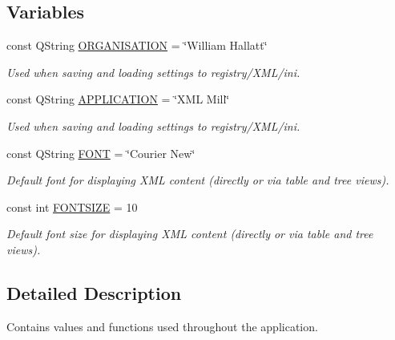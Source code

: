 \subsection*{\-Variables}
\begin{DoxyCompactItemize}
\item 
const \-Q\-String \hyperlink{namespace_g_c_global_space_a97583835f9987b1c94ff05802ccfe42f}{\-O\-R\-G\-A\-N\-I\-S\-A\-T\-I\-O\-N} = \char`\"{}\-William \-Hallatt\char`\"{}
\begin{DoxyCompactList}\small\item\em \-Used when saving and loading settings to registry/\-X\-M\-L/ini. \end{DoxyCompactList}\item 
const \-Q\-String \hyperlink{namespace_g_c_global_space_ab53b9c3447f00f1cc45a1d3fdfbba564}{\-A\-P\-P\-L\-I\-C\-A\-T\-I\-O\-N} = \char`\"{}\-X\-M\-L \-Mill\char`\"{}
\begin{DoxyCompactList}\small\item\em \-Used when saving and loading settings to registry/\-X\-M\-L/ini. \end{DoxyCompactList}\item 
const \-Q\-String \hyperlink{namespace_g_c_global_space_a9d7158c8a1dfcc867d85ee6b9c5c4810}{\-F\-O\-N\-T} = \char`\"{}\-Courier \-New\char`\"{}
\begin{DoxyCompactList}\small\item\em \-Default font for displaying \-X\-M\-L content (directly or via table and tree views). \end{DoxyCompactList}\item 
const int \hyperlink{namespace_g_c_global_space_ab9fa2f10bab070a4f59b7e3ef9166c86}{\-F\-O\-N\-T\-S\-I\-Z\-E} = 10
\begin{DoxyCompactList}\small\item\em \-Default font size for displaying \-X\-M\-L content (directly or via table and tree views). \end{DoxyCompactList}\end{DoxyCompactItemize}


\subsection{\-Detailed \-Description}
\-Contains values and functions used throughout the application. 

